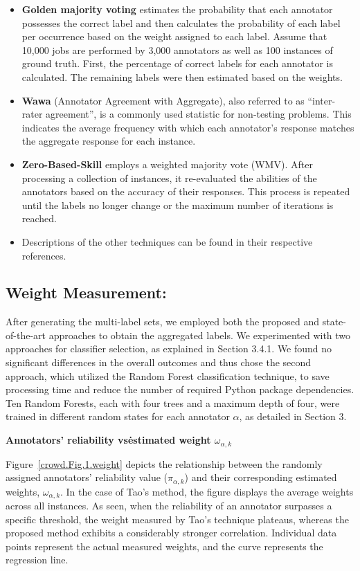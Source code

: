 \begin{itemize}
    \item \textbf{Golden majority voting} estimates the probability that each annotator possesses the correct label and then calculates the probability of each label per occurrence based on the weight assigned to each label. Assume that 10,000 jobs are performed by 3,000 annotators as well as 100 instances of ground truth. First, the percentage of correct labels for each annotator is calculated. The remaining labels were then estimated based on the weights.
    \item \textbf{Wawa} (Annotator Agreement with Aggregate), also referred to as ``inter-rater agreement'', is a commonly used statistic for non-testing problems. This indicates the average frequency with which each annotator's response matches the aggregate response for each instance.
    \item \textbf{Zero-Based-Skill} employs a weighted majority vote (WMV). After processing a collection of instances, it re-evaluated the abilities of the annotators based on the accuracy of their responses. This process is repeated until the labels no longer change or the maximum number of iterations is reached.

    \item Descriptions of the other techniques can be found in their respective references.
\end{itemize}

\subsection{Weight Measurement:}

After generating the multi-label sets, we employed both the proposed and state-of-the-art approaches to obtain the aggregated labels. We experimented with two approaches for classifier selection, as explained in Section 3.4.1. We found no significant differences in the overall outcomes and thus chose the second approach, which utilized the Random Forest classification technique, to save processing time and reduce the number of required Python package dependencies. Ten Random Forests, each with four trees and a maximum depth of four, were trained in different random states for each annotator $\alpha $, as detailed in Section 3.

\textbf{Annotators' reliability vs\. estimated weight $\omega_{\alpha,k}$ }

Figure~\ref{crowd.Fig.1.weight} depicts the relationship between the randomly assigned annotators' reliability value ($\pi_{\alpha,k}$) and their corresponding estimated weights, $\omega_{\alpha,k}$. In the case of Tao's method, the figure displays the average weights across all instances. As seen, when the reliability of an annotator surpasses a specific threshold, the weight measured by Tao's technique plateaus, whereas the proposed method exhibits a considerably stronger correlation. Individual data points represent the actual measured weights, and the curve represents the regression line.

